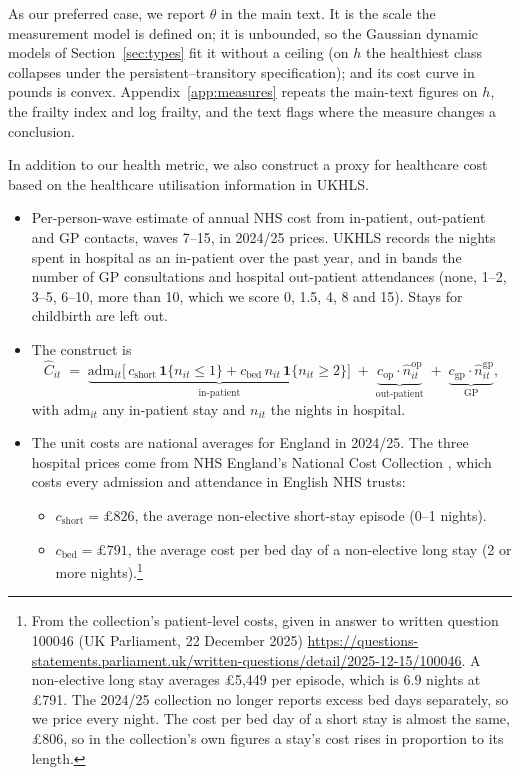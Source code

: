 \documentclass[11pt]{article}
\begin{document}
	As our preferred case, we report $\theta$ in the main text. It is the scale the measurement model is defined on; it is unbounded, so the Gaussian dynamic models of Section~\ref{sec:types} fit it without a ceiling (on $h$ the healthiest class collapses under the persistent--transitory specification); and its cost curve in pounds is convex. Appendix~\ref{app:measures} repeats the main-text figures on $h$, the frailty index and log frailty, and the text flags where the measure changes a conclusion.
	
	
	
	In addition to our health metric, we also construct a proxy for healthcare cost based on the healthcare utilisation information in UKHLS.
	\begin{itemize}
		\item Per-person-wave estimate of annual NHS cost from in-patient, out-patient and GP contacts, waves 7--15, in 2024/25 prices. UKHLS records the nights spent in hospital as an in-patient over the past year, and in bands the number of GP consultations and hospital out-patient attendances (none, 1--2, 3--5, 6--10, more than 10, which we score 0, 1.5, 4, 8 and 15). Stays for childbirth are left out.
		\item The construct is
		\begin{equation}
		\widehat{C}_{it} \;=\;
		\underbrace{\text{adm}_{it}\bigl[\,c_{\text{short}}\,\mathbf{1}\{n_{it}\le 1\} + c_{\text{bed}}\, n_{it}\,\mathbf{1}\{n_{it}\ge 2\}\bigr]}_{\text{in-patient}}
		\;+\;
		\underbrace{c_{\text{op}} \cdot \widehat{n}^{\text{op}}_{it}}_{\text{out-patient}}
		\;+\;
		\underbrace{c_{\text{gp}} \cdot \widehat{n}^{\text{gp}}_{it}}_{\text{GP}},
		\end{equation}
		with $\text{adm}_{it}$ any in-patient stay and $n_{it}$ the nights in hospital.
		\item The unit costs are national averages for England in 2024/25. The three hospital prices come from NHS England's National Cost Collection \citep{ncc2025}, which costs every admission and attendance in English NHS trusts:
		\begin{itemize}
			\item $c_{\text{short}} = \pounds826$, the average non-elective short-stay episode (0--1 nights).
			\item $c_{\text{bed}} = \pounds791$, the average cost per bed day of a non-elective long stay (2 or more nights).\footnote{From the collection's patient-level costs, given in answer to written question 100046 (UK Parliament, 22 December 2025) \url{https://questions-statements.parliament.uk/written-questions/detail/2025-12-15/100046}. A non-elective long stay averages \pounds5{,}449 per episode, which is $6.9$ nights at \pounds791. The 2024/25 collection no longer reports excess bed days separately, so we price every night. The cost per bed day of a short stay is almost the same, \pounds806, so in the collection's own figures a stay's cost rises in proportion to its length.}

\end{itemize}
\end{itemize}
\end{document}
